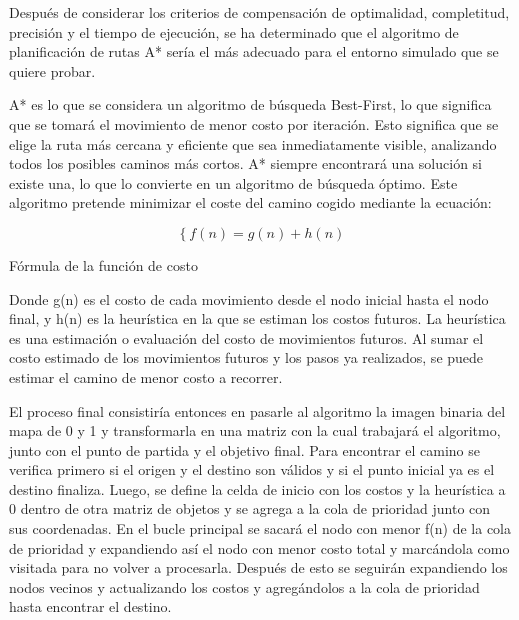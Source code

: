 Después de considerar los criterios de compensación de optimalidad, completitud, precisión y el tiempo de ejecución, se ha determinado que el algoritmo de planificación de rutas A*
sería el más adecuado para el entorno simulado que se quiere probar. 


A* es lo que se considera un algoritmo de búsqueda Best-First, lo que significa que se tomará el movimiento de menor costo por iteración. Esto significa que se elige la ruta más cercana y eficiente que sea inmediatamente visible, analizando todos los posibles caminos más cortos. A* siempre encontrará una solución si existe una, lo que lo convierte en un algoritmo de búsqueda óptimo. Este algoritmo pretende minimizar el coste del camino cogido mediante la ecuación:


\begin{myequation}[H]
\begin{equation}
\left\{
	f(n) = g(n) + h(n)
\right.
\label{ec:ec6}
\end{equation}
\caption[Fórmula de la función de costo]{Fórmula de la función de costo}
\end{myequation}


Donde g(n) es el costo de cada movimiento desde el nodo inicial hasta el nodo final, y h(n) es la
heurística en la que se estiman los costos futuros. La heurística es una estimación o evaluación del costo de
movimientos futuros. Al sumar el costo estimado de los movimientos futuros y los pasos ya realizados, se puede estimar el camino de menor costo a recorrer.


El proceso final consistiría entonces en pasarle al algoritmo la imagen binaria del mapa de 0 y 1 y transformarla en una matriz con la cual trabajará el algoritmo, junto con el punto de partida y el objetivo final. Para encontrar el camino se verifica primero si el origen y el destino son válidos y si el punto inicial ya es el destino finaliza. Luego, se define la celda de inicio con los costos y la heurística a 0 dentro de otra matriz de objetos y se agrega a la cola de prioridad junto con sus coordenadas. En el bucle principal se sacará el nodo con menor f(n) de la cola de prioridad y expandiendo así el nodo con menor costo total y marcándola como visitada para no volver a procesarla. Después de esto se seguirán expandiendo los nodos vecinos y actualizando los costos y agregándolos a la cola de prioridad hasta encontrar el destino.

